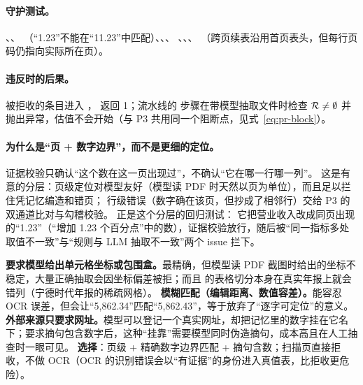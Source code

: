 \paragraph{守护测试。}、、
（“1.23”不能在“11.23”中匹配）、、、
、、、
（跨页续表沿用首页表头，但每行页码仍指向实际所在页）。

\paragraph{违反时的后果。}被拒收的条目进入 ， 返回 1；流水线的  步骤在带模型抽取文件时检查
$\mathcal{R}\neq\emptyset$ 并抛出异常，估值不会开始（与 P3 共用同一个阻断点，见式~\eqref{eq:pr-block}）。

\paragraph{为什么是“页 + 数字边界”，而不是更细的定位。}证据校验只确认“这个数在这一页出现过”，不确认“它在哪一行哪一列”。
这是有意的分层：页级定位对模型友好（模型读 PDF 时天然以页为单位），而且足以拦住凭记忆编造和错页；
行级错误（数字确在该页，但抄成了相邻行）交给 P3 的双通道比对与勾稽校验。 正是这个分层的回归测试：
它把营业收入改成同页出现的“1.23”（“增加 1.23 个百分点”中的数），证据校验放行，随后被“同一指标多处取值不一致”与“规则与 LLM 抽取不一致”两个 issue 拦下。

\begin{tradeoff}[：证据粒度与匹配方式]
\textbf{要求模型给出单元格坐标或包围盒。}最精确，但模型读 PDF 截图时给出的坐标不稳定，大量正确抽取会因坐标偏差被拒；而且  的表格切分本身在真实年报上就会错列（宁德时代年报的稀疏网格）。
\textbf{模糊匹配（编辑距离、数值容差）。}能容忍 OCR 误差，但会让“5,862.34”匹配“5,862.43”，等于放弃了“逐字可定位”的意义。
\textbf{外部来源只要求网址。}模型可以登记一个真实网址，却把记忆里的数字挂在它名下；要求摘句包含数字后，这种“挂靠”需要模型同时伪造摘句，成本高且在人工抽查时一眼可见。
\textbf{选择}：页级 + 精确数字边界匹配 + 摘句含数；扫描页直接拒收，不做 OCR（OCR 的识别错误会以“有证据”的身份进入真值表，比拒收更危险）。
\end{tradeoff}


